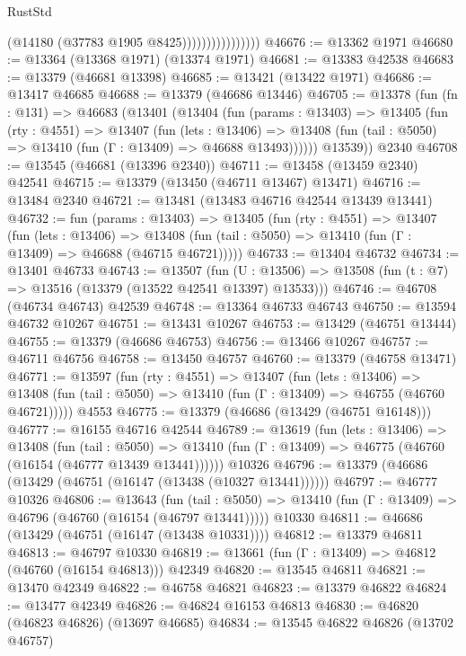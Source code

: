 \begin{lexlean}{RustStd}
\begin{coremodule}
                                (@14180 (@37783 @1905 @8425))))))))))))))))
@46676 := @13362 @1971
@46680 := @13364 (@13368 @1971) (@13374 @1971)
@46681 := @13383 @42538
@46683 := @13379 (@46681 @13398)
@46685 := @13421 (@13422 @1971)
@46686 := @13417 @46685
@46688 := @13379 (@46686 @13446)
@46705 := @13378
    (fun (fn : @131) =>
    @46683
      (@13401
        (@13404
          (fun (params : @13403) =>
          @13405
            (fun (rty : @4551) =>
            @13407
              (fun (lets : @13406) =>
              @13408 (fun (tail : @5050) => @13410 (fun (Γ : @13409) => @46688 @13493))))))
        @13539))
    @2340
@46708 := @13545 (@46681 (@13396 @2340))
@46711 := @13458 (@13459 @2340) @42541
@46715 := @13379 (@13450 (@46711 @13467) @13471)
@46716 := @13484 @2340
@46721 := @13481 (@13483 @46716 @42544 @13439 @13441)
@46732 := fun (params : @13403) =>
  @13405
    (fun (rty : @4551) =>
    @13407
      (fun (lets : @13406) =>
      @13408 (fun (tail : @5050) => @13410 (fun (Γ : @13409) => @46688 (@46715 @46721)))))
@46733 := @13404 @46732
@46734 := @13401 @46733
@46743 := @13507
    (fun (U : @13506) => @13508 (fun (t : @7) => @13516 (@13379 (@13522 @42541 @13397) @13533)))
@46746 := @46708 (@46734 @46743) @42539
@46748 := @13364 @46733 @46743
@46750 := @13594 @46732 @10267
@46751 := @13431 @10267
@46753 := @13429 (@46751 @13444)
@46755 := @13379 (@46686 @46753)
@46756 := @13466 @10267
@46757 := @46711 @46756
@46758 := @13450 @46757
@46760 := @13379 (@46758 @13471)
@46771 := @13597
    (fun (rty : @4551) =>
    @13407
      (fun (lets : @13406) =>
      @13408 (fun (tail : @5050) => @13410 (fun (Γ : @13409) => @46755 (@46760 @46721)))))
    @4553
@46775 := @13379 (@46686 (@13429 (@46751 @16148)))
@46777 := @16155 @46716 @42544
@46789 := @13619
    (fun (lets : @13406) =>
    @13408
      (fun (tail : @5050) =>
      @13410 (fun (Γ : @13409) => @46775 (@46760 (@16154 (@46777 @13439 @13441))))))
    @10326
@46796 := @13379 (@46686 (@13429 (@46751 (@16147 (@13438 (@10327 @13441))))))
@46797 := @46777 @10326
@46806 := @13643
    (fun (tail : @5050) => @13410 (fun (Γ : @13409) => @46796 (@46760 (@16154 (@46797 @13441)))))
    @10330
@46811 := @46686 (@13429 (@46751 (@16147 (@13438 @10331))))
@46812 := @13379 @46811
@46813 := @46797 @10330
@46819 := @13661 (fun (Γ : @13409) => @46812 (@46760 (@16154 @46813))) @42349
@46820 := @13545 @46811
@46821 := @13470 @42349
@46822 := @46758 @46821
@46823 := @13379 @46822
@46824 := @13477 @42349
@46826 := @46824 @16153 @46813
@46830 := @46820 (@46823 @46826) (@13697 @46685)
@46834 := @13545 @46822 @46826 (@13702 @46757)

\end{coremodule}
\end{lexlean}
